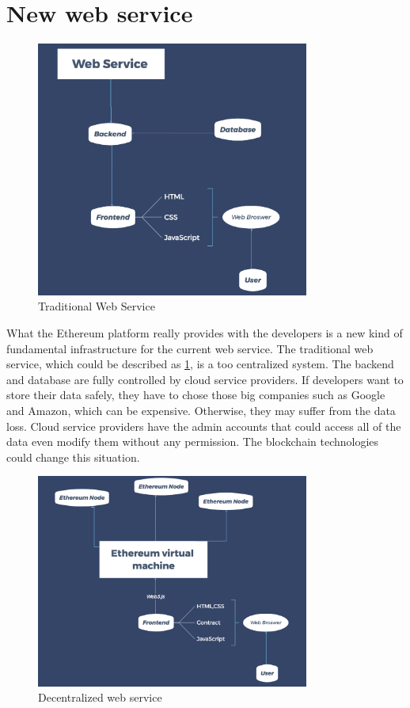 \documentclass[openany,12pt]{ecsthesis}      %
\begin{document}
\section{New web service}
\begin{figure}[H]
  \centering
  \includegraphics[width=0.8\textwidth]{triditionalWebService.png}
  \caption{Traditional Web Service}
  \label{service} 
\end{figure}
What the Ethereum platform really provides with the developers is a new kind of fundamental infrastructure for the current web service.
The traditional web service, which could be described as \ref{service}, is a too centralized system.
The backend and database are fully controlled by cloud service providers. If developers want to store their data safely, 
they have to chose those big companies such as Google and Amazon, which can be expensive. 
Otherwise, they may suffer from the data loss. 
Cloud service providers have the admin accounts that could access all of the data even modify them without any permission.
The blockchain technologies could change this situation.
\begin{figure}[H]
  \centering
  \includegraphics[width=0.8\textwidth]{EthereumWeb.png}
  \caption{Decentralized web service}
  \label{newservice} 
\end{figure}
\end{document}
